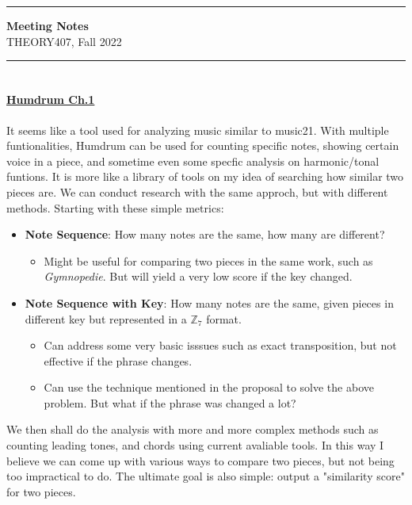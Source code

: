 \documentclass[12pt]{report}
\renewcommand{\maketitle}{
\hrule height 1pt
\begin{center}
{\bf \large Meeting Notes}\\[2mm]
THEORY407, Fall 2022\\[2mm]
\end{center}
\hrule height 1pt
}
\begin{document}
\maketitle
\tableofcontents
\section*{}
\paragraph*{\href{https://www.humdrum.org/guide/ch01/}{Humdrum Ch.1}}

It seems like a tool used for analyzing music similar to music21. With multiple 
funtionalities, Humdrum can be used for counting specific notes, showing certain
voice in a piece, and sometime even some specfic analysis on 
harmonic/tonal funtions. It is more like a library of tools on my idea of 
searching how similar two pieces are. We can conduct research with the same
approch, but with different methods. Starting with these simple metrics:
\begin{itemize}
    \item \textbf{Note Sequence}: How many notes are the same, how many are different?
        \begin{itemize}
            \item Might be useful for comparing two pieces in the same work, such as 
            \emph{Gymnopedie}. But will yield a very low score if the key changed.
        \end{itemize}
    \item \textbf{Note Sequence with Key}: How many notes are the same, given pieces 
    in different key but represented in a $\mathbb{Z}_7$ format.
    \begin{itemize}
        \item Can address some very basic isssues such as exact transposition,
        but not effective if the phrase changes. 
        \item Can use the technique mentioned in the proposal to
        solve the above problem. But what if the phrase was changed a lot?
    \end{itemize}
\end{itemize}
We then shall do the analysis with more and more complex methods such as counting
leading tones, and chords using current avaliable tools. In this way I believe we can come up with 
various ways to compare two pieces, but not being too impractical to do. The ultimate
goal is also simple: output a "similarity score" for two pieces.
\end{document}
